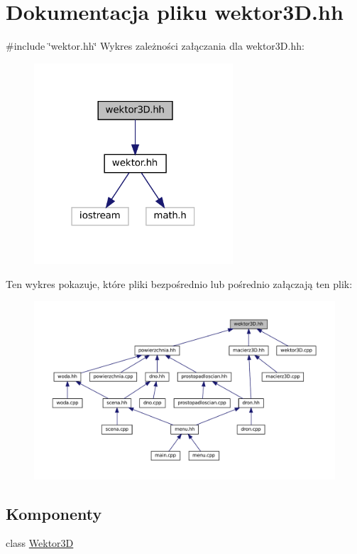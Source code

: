 \hypertarget{wektor3_d_8hh}{}\section{Dokumentacja pliku wektor3\+D.\+hh}
\label{wektor3_d_8hh}
{\ttfamily \#include \char`\"{}wektor.\+hh\char`\"{}}\newline
Wykres zależności załączania dla wektor3\+D.\+hh\+:\nopagebreak
\begin{figure}[H]
\begin{center}
\leavevmode
\includegraphics[width=210pt]{wektor3_d_8hh__incl}
\end{center}
\end{figure}
Ten wykres pokazuje, które pliki bezpośrednio lub pośrednio załączają ten plik\+:
\nopagebreak
\begin{figure}[H]
\begin{center}
\leavevmode
\includegraphics[width=350pt]{wektor3_d_8hh__dep__incl}
\end{center}
\end{figure}
\subsection*{Komponenty}
\begin{DoxyCompactItemize}
\item 
class \mbox{\hyperlink{class_wektor3_d}{Wektor3D}}
\end{DoxyCompactItemize}
